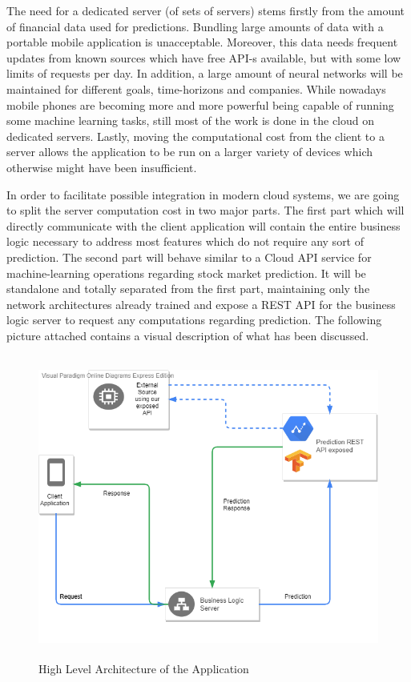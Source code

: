 The need for a dedicated server (of sets of servers) stems firstly from the amount of financial data used for predictions. Bundling large amounts of data with a portable mobile application is unacceptable. Moreover, this data needs frequent updates from known sources which have free API-s available, but with some low limits of requests per day. In addition, a large amount of neural networks will be maintained for different goals, time-horizons and companies. While nowadays mobile phones are becoming more and more powerful being capable of running some machine learning tasks, still most of the work is done in the cloud on dedicated servers. Lastly, moving the computational cost from the client to a server allows the application to be run on a larger variety of devices which otherwise might have been insufficient.

In order to facilitate possible integration in modern cloud systems, we are going to split the server computation cost in two major parts. The first part which will directly communicate with the client application will contain the entire business logic necessary to address most features which do not require any sort of prediction. The second part will behave similar to a Cloud API service for machine-learning operations regarding stock market prediction. It will be standalone and totally separated from the first part, maintaining only the network architectures already trained and expose a REST API for the business logic server to request any computations regarding prediction. The following picture attached contains a visual description of what has been discussed.

\begin{figure}[H]
\centering
\includegraphics[height=10cm]{images/HighLevelArchitecture.png} 
\caption{High Level Architecture of the Application}
\label{fig:highlevelarchitecture}
\end{figure}



